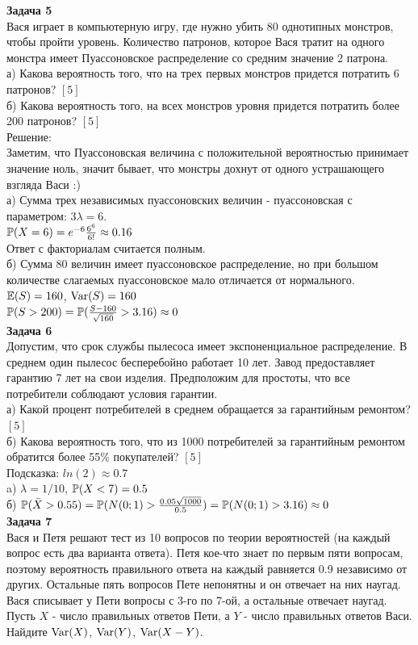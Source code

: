 \documentclass[12pt, a4paper]{article}\usepackage[]{graphicx}\usepackage[]{color}
\begin{document}
	\textbf{Задача 5} \\
	Вася играет в компьютерную игру, где нужно убить 80 однотипных монстров, чтобы пройти уровень. Количество патронов, которое Вася тратит на одного монстра имеет Пуассоновское распределение со средним значение 2 патрона. \\
	а) Какова вероятность того, что на трех первых монстров придется потратить 6 патронов? $[5]$ \\
	б) Какова вероятность того, на всех монстров уровня придется потратить более 200 патронов? $[5]$ \\
	Решение: \\
	Заметим, что Пуассоновская величина с положительной вероятностью принимает значение ноль, значит бывает, что монстры дохнут от одного устрашающего взгляда Васи :) \\
	а) Сумма трех независимых пуассоновских величин - пуассоновская с параметром: $3\lambda=6$. \\
	$\P(X=6)=e^{-6}\frac{6^6}{6!}\approx 0.16$ \\
	Ответ с факториалам считается полным. \\
	б) Сумма 80 величин имеет пуассоновское распределение, но при большом количестве слагаемых пуассоновское мало отличается от нормального. \\
	$\E(S)=160$, $\Var(S)=160$ \\
	$\P(S>200)=\P(\frac{S-160}{\sqrt{160}}>3.16)\approx 0$ \\



	\textbf{Задача 6} \\
	Допустим, что срок службы пылесоса имеет экспоненциальное распределение. В среднем один пылесос бесперебойно работает 10 лет. Завод предоставляет гарантию 7 лет на свои изделия. Предположим для простоты, что все потребители соблюдают условия гарантии. \\
	а) Какой процент потребителей в среднем обращается за гарантийным ремонтом? $[5]$ \\
	б) Какова вероятность того, что из 1000 потребителей за гарантийным ремонтом обратится более 55\% покупателей? $[5]$ \\
	Подсказка: $ln(2)\approx 0.7$ \\
	a) $\lambda=1/10$, $\P(X<7)=0.5$ \\
	б) $\P(\bar{X}>0.55)=\P(N(0;1)>\frac{0.05\sqrt{1000}}{0.5})=\P(N(0;1)>3.16)\approx 0$ \\


	\textbf{Задача 7} \\ %
	Вася и Петя решают тест из 10 вопросов по теории вероятностей (на каждый вопрос есть два варианта ответа). Петя кое-что знает по первым пяти вопросам, поэтому вероятность правильного ответа на каждый равняется 0.9 независимо от других. Остальные пять вопросов Пете непонятны и он отвечает на них наугад. Вася списывает у Пети вопросы с 3-го по 7-ой, а остальные отвечает наугад. \\
	Пусть $X$ - число правильных ответов Пети, а $Y$ - число правильных ответов Васи. \\
	Найдите $\Var(X)$, $\Var(Y)$, $\Var(X-Y)$. \\
\end{document}
